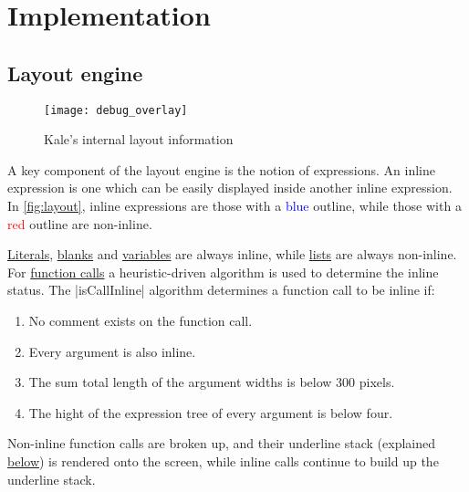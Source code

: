 \clearpage
\chapter{Implementation}

\section{Layout engine}

\begin{wrapfigure}[11]{r}{0.5\columnwidth}
\texttt{[image: debug\_overlay]}
\caption{Kale's internal layout information\protect\footnotemark}
\label{fig:layout}
\end{wrapfigure}
\medskip

A key component of the layout engine is the notion of  expressions.
An inline expression is one which can be easily displayed inside another inline
expression. In \autoref{fig:layout}, inline expressions are those with a
\textcolor{blue}{blue} outline, while those with a \textcolor{red}{red} outline are
non-inline.

\hyperref[expr:literal]{Literals}, \hyperref[expr:blank]{blanks} and
\hyperref[expr:variable]{variables} are always inline, while
\hyperref[expr:list]{lists} are always non-inline.
For \hyperref[expr:function]{function calls} a heuristic-driven algorithm is
used to determine the inline status. The |isCallInline| algorithm determines
a function call to be inline if:

\begin{enumerate}[noitemsep]
	\item No comment exists on the function call.
	\item Every argument is also inline.
	\item The sum total length of the argument widths is below 300 pixels.
	\item The hight of the expression tree of every argument is below four.
\end{enumerate}

Non-inline function calls are broken up, and their underline stack (explained
\hyperref[layout:underlines]{below}) is rendered onto the screen, while inline
calls continue to build up the underline stack.

